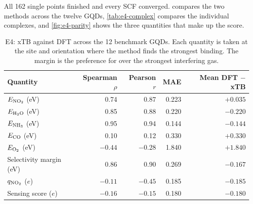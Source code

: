 All 162 single points finished and every SCF converged.  compares the two methods
across the twelve GQDs, \cref{tab:e4-complex} compares the individual complexes, and
\cref{fig:e4-parity} shows the three quantities that make up the score.

\begin{table}[ht]
  \centering
  \caption{E4: xTB against DFT across the 12 benchmark GQDs. Each quantity is taken at the site
           and orientation where the method finds the strongest binding. The margin is the
           preference for  over the strongest interfering gas.}
  \label{tab:e4-rho}
  \small
  \begin{tabular}{@{}lrrrr@{}}
    \toprule
    Quantity & Spearman \(\rho\) & Pearson \(r\) & MAE & Mean DFT \(-\) xTB \\
    \midrule
    \(E_{\ce{NO2}}\) (eV) & 0.74 & 0.87 & 0.223 & \(+0.035\) \\
    \(E_{\ce{H2O}}\) (eV) & 0.85 & 0.88 & 0.220 & \(-0.220\) \\
    \(E_{\ce{NH3}}\) (eV) & 0.95 & 0.94 & 0.144 & \(-0.144\) \\
    \(E_{\ce{CO}}\) (eV) & 0.10 & 0.12 & 0.330 & \(+0.330\) \\
    \(E_{\ce{O2}}\) (eV) & \(-0.44\) & \(-0.28\) & 1.840 & \(+1.840\) \\
    Selectivity margin (eV) & 0.86 & 0.90 & 0.269 & \(-0.167\) \\
    \(q_{\ce{NO2}}\) (\(e\)) & \(-0.11\) & \(-0.45\) & 0.185 & \(-0.185\) \\
    Sensing score (\(e\)) & \(-0.16\) & \(-0.15\) & 0.180 & \(-0.180\) \\
    \bottomrule
  \end{tabular}
\end{table}

